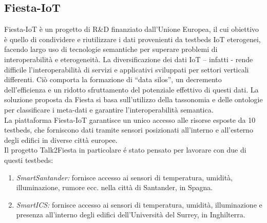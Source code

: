 \documentclass[a4paper,11pt]{article}
\theoremstyle{plain}
\begin{document}
\subsection*{Fiesta-IoT}
Fiesta-IoT è un progetto di R\&D finanziato dall’Unione Europea, il cui obiettivo è quello di condividere e riutilizzare i dati provenienti da testbeds IoT eterogenei, facendo largo uso di tecnologie semantiche per superare problemi di interoperabilit\`a e eterogeneit\`a.  La diversificazione dei dati IoT – infatti - rende difficile l'interoperabilità di servizi e applicativi sviluppati per settori verticali differenti. Ciò comporta la formazione di “data silos”, un decremento dell'efficienza e un ridotto sfruttamento del potenziale effettivo di questi dati.
La soluzione proposta da Fiesta si basa sull'utilizzo della tassonomia e delle ontologie per classificare i meta-dati e garantire l'interoperabilità semantica.\\
La piattaforma Fiesta-IoT garantisce un unico accesso alle risorse esposte da 10 testbeds, che forniscono dati tramite sensori posizionati all'interno e all'esterno degli edifici in diverse città europee.\\
Il progetto Talk2Fiesta in particolare \'e stato pensato per lavorare con due di questi testbeds:
\begin{enumerate}
\item {\it SmartSantander:} fornisce accesso ai sensori di temperatura, umidità, illuminazione, rumore ecc. nella città di Santander, in Spagna.
\item {\it SmartICS:} fornisce accesso ai sensori di temperatura, umidità, illuminazione e presenza all'interno degli edifici dell’Università del Surrey, in Inghilterra.
\end{enumerate} 
\end{document}
